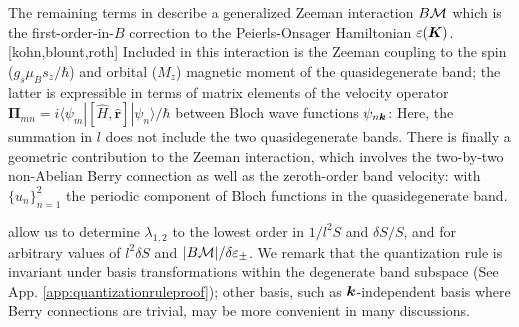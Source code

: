 \documentclass[aps, prb, showpacs, twocolumn, notitlepage, superscriptaddress]{revtex4-1}
\begin{document}


The remaining terms in  describe a generalized Zeeman interaction $B{\cal M}$ which is the first-order-in-$B$ correction to the Peierls-Onsager Hamiltonian $\varepsilon(\boldsymbol{K})$.[kohn,blount,roth] Included in this interaction is the Zeeman coupling to the spin ($g_s\mu_Bs_z/\hbar$) and orbital ($M_z$) magnetic moment of the quasidegenerate band; the latter is expressible in terms of matrix elements of the velocity operator $\boldsymbol{\Pi}_{mn}=i\langle\psi_m|[\hat{H}, \hat{\boldsymbol{r}}]|\psi_n\rangle/\hbar$ between Bloch wave functions $\psi_{n\boldsymbol{k}}$:
Here, the summation in $l$ does not include the two quasidegenerate bands.  There is finally a geometric contribution to the Zeeman interaction, which involves the two-by-two non-Abelian Berry connection  as well as the  zeroth-order band velocity: 
with $\{u_n\}_{n=1}^2$ the periodic component of Bloch functions in the quasidegenerate band. 

 allow us to determine $\lambda_{1,2}$ to the lowest order  in $1/l^2S$ and $\delta S/S$, and for arbitrary values of $l^2\delta S$ and $|B{\cal M}|/\delta \varepsilon_{\pm}$. We remark that the quantization rule is invariant under basis transformations within the degenerate band subspace (See App. \ref{app:quantizationruleproof}); other basis, such as $\boldsymbol{k}$-independent basis where Berry connections are trivial, may be more convenient in many discussions.

\end{document}
